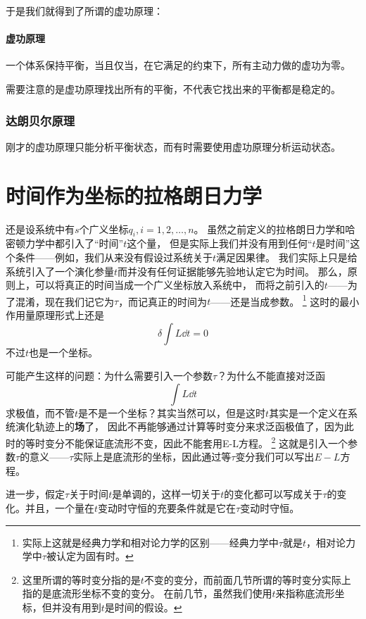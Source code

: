 \documentclass[UTF8, a4paper]{ctexart}
\begin{document}
于是我们就得到了所谓的虚功原理：
\paragraph{虚功原理} 一个体系保持平衡，当且仅当，在它满足的约束下，所有主动力做的虚功为零。

需要注意的是虚功原理找出所有的平衡，不代表它找出来的平衡都是稳定的。

\subsubsection{达朗贝尔原理}
刚才的虚功原理只能分析平衡状态，而有时需要使用虚功原理分析运动状态。

\section{时间作为坐标的拉格朗日力学}
还是设系统中有$s$个广义坐标$q_i, i=1, 2, \ldots, n$。
虽然之前定义的拉格朗日力学和哈密顿力学中都引入了“时间”$t$这个量，
但是实际上我们并没有用到任何“$t$是时间”这个条件——例如，我们从来没有假设过系统关于$t$满足因果律。
我们实际上只是给系统引入了一个演化参量$t$而并没有任何证据能够先验地认定它为时间。
那么，原则上，可以将真正的时间当成一个广义坐标放入系统中，
而将之前引入的$t$——为了混淆，现在我们记它为$\tau$，而记真正的时间为$t$——还是当成参数。%
\footnote{实际上这就是经典力学和相对论力学的区别——经典力学中$\tau$就是$t$，相对论力学中$\tau$被认定为固有时。}
这时的最小作用量原理形式上还是
\[
    \delta \int L \dd t = 0
\]
不过$t$也是一个坐标。

可能产生这样的问题：为什么需要引入一个参数$\tau$？为什么不能直接对泛函
\[
    \int L \dd t
\]
求极值，而不管$t$是不是一个坐标？其实当然可以，但是这时$t$其实是一个定义在系统演化轨迹上的\textbf{场}了，
因此不再能够通过计算等时变分来求泛函极值了，因为此时的等时变分不能保证底流形不变，因此不能套用E-L方程。%
\footnote{这里所谓的等时变分指的是$t$不变的变分，而前面几节所谓的等时变分实际上指的是底流形坐标不变的变分。
在前几节，虽然我们使用$t$来指称底流形坐标，但并没有用到$t$是时间的假设。}%
这就是引入一个参数$\tau$的意义——$\tau$实际上是底流形的坐标，因此通过等$\tau$变分我们可以写出$E-L$方程。

进一步，假定$\tau$关于时间$t$是单调的，这样一切关于$t$的变化都可以写成关于$\tau$的变化。并且，一个量在$t$变动时守恒的充要条件就是它在$\tau$变动时守恒。
\end{document}
